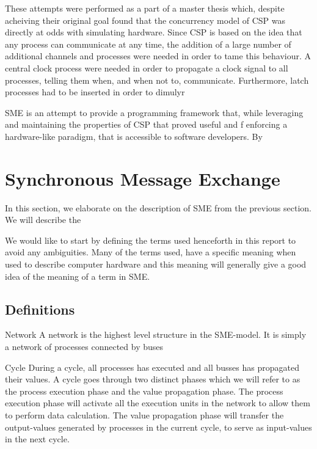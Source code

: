These attempts were performed as a part of a master thesis which,
despite acheiving their original goal found that the concurrency model
of CSP was directly at odds with simulating hardware. Since CSP is
based on the idea that any process can communicate at any time,
the addition of a large number of additional channels and processes
were needed in order to tame this behaviour. A central clock process
were needed in order to propagate a clock signal to all processes,
telling them when, and when not to, communicate. Furthermore, latch
processes had to be inserted in order to dimulyr 

SME is an attempt to provide a programming framework that, while
leveraging and maintaining the properties of CSP that proved useful
and f enforcing a hardware-like paradigm, that is accessible to
software developers. By \cite{vinter2014synchronous}

\section{Synchronous Message Exchange}
In this section, we elaborate on the description of SME from the
previous section. We will describe the 

We would like to start by defining the terms used henceforth in this
report to avoid any ambiguities. Many of the terms used, have a
specific meaning when used to describe computer hardware and this
meaning will generally give a good idea of the meaning of a term in
SME.


\subsection{Definitions}

\begin{description}
  \item{Network} A network is the highest level structure in the
    SME-model. It is simply a network of processes connected by buses
  \item{Cycle} During a cycle, all processes has executed and all
    busses has propagated their values. A cycle goes through two
    distinct phases which we will refer to as the process execution
    phase and the value propagation phase. The process execution phase
    will activate all the execution units in the network to allow them
    to perform data calculation. The value propagation phase will
    transfer the output-values generated by processes in the current
    cycle, to serve as input-values in the next cycle.
\end{description}


